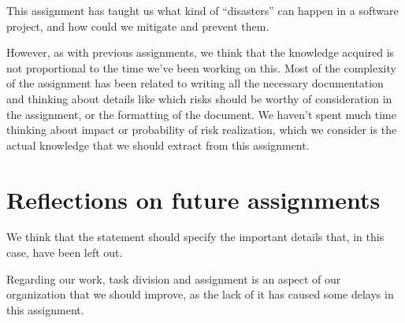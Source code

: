 This assignment has taught us what kind of ``disasters'' can happen in a software project, and how could we mitigate and prevent them.

However, as with previous assignments, we think that the knowledge acquired is not proportional to the time we've been working on this. Most of the complexity of the assignment has been related to writing all the necessary documentation and thinking about details like which risks should be worthy of consideration in the assignment, or the formatting of the document. We haven't spent much time thinking about impact or probability of risk realization, which we consider is the actual knowledge that we should extract from this assignment.

\section{Reflections on future assignments}

We think that the statement should specify the important details that, in this case, have been left out.

Regarding our work, task division and assignment is an aspect of our organization that we should improve, as the lack of it has caused some delays in this assignment.